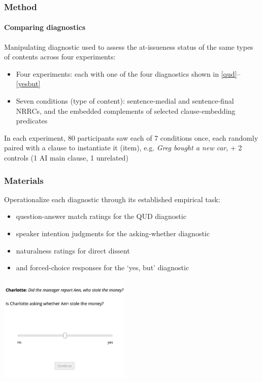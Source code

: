 \documentclass[compress, xcolor = dvipsnames, aspectratio=169]{beamer}
\begin{document}
	\begin{frame}\frametitle{Method}
		\framesubtitle{Comparing diagnostics}

			Manipulating diagnostic used to assess the at-issueness status of the same types of contents across four experiments:
			\begin{itemize}
				\item Four experiments: each with one of the four diagnostics shown in \ref{qud}--\ref{yesbut}

				\item Seven conditions (type of content): sentence-medial and sentence-final NRRCs, and the embedded complements of selected clause-embedding predicates
				
			\end{itemize}
			
		    \medskip %

		    In each experiment, 80 participants saw each of 7 conditions once, each randomly paired with a clause to instantiate it (item), e.g. \emph{Greg bought a new car}, + 2 controls (1 AI main clause, 1 unrelated) 
		
		\end{frame}

		\begin{frame}[t]\frametitle{Materials}\scriptsize
		
			Operationalize each diagnostic through its established empirical task:
			\begin{itemize}
				\item question-answer match ratings for the QUD diagnostic
				\item speaker intention judgments for the asking-whether diagnostic
				\item naturalness ratings for direct dissent
				\item and forced-choice responses for the ‘yes, but’ diagnostic
			\end{itemize}
			
			\includegraphics[width=0.47\textwidth]{../../writing/paper/figures/trialExp2}
		\end{frame}
\end{document}
